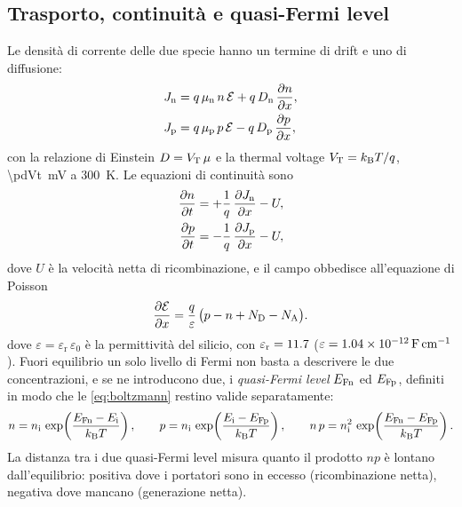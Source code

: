 \documentclass[10pt,a4paper]{scrartcl}
\let\newcommand\pdvaluedefine
\newcommand{\VT}{V_\mathrm{T}}
\newcommand{\Ef}{\mathcal{E}}                 %
\newcommand{\ND}{N_\mathrm{D}}
\newcommand{\NA}{N_\mathrm{A}}
\newcommand{\nint}{n_\mathrm{i}}
\newcommand{\Dn}{D_\mathrm{n}}
\newcommand{\Dp}{D_\mathrm{p}}
\newcommand{\mun}{\mu_\mathrm{n}}
\newcommand{\mup}{\mu_\mathrm{p}}
\newcommand{\Jn}{J_\mathrm{n}}
\newcommand{\Jp}{J_\mathrm{p}}
\newcommand{\kB}{k_\mathrm{B}}
\newcommand{\EFn}{E_\mathrm{Fn}}
\newcommand{\EFp}{E_\mathrm{Fp}}
\newcommand{\dpar}[2]{\frac{\partial #1}{\partial #2}}
\begin{document}
\subsection{Trasporto, continuità e quasi-Fermi level}
\label{sec:transport}
Le densità di corrente delle due specie hanno un termine di drift e uno di diffusione:
\begin{align}
\Jn &= q\,\mun\,n\,\Ef + q\,\Dn\,\dpar{n}{x} , \label{eq:jn}\\
\Jp &= q\,\mup\,p\,\Ef - q\,\Dp\,\dpar{p}{x} , \label{eq:jp}
\end{align}
con la relazione di Einstein $D = \VT\,\mu$ e la thermal voltage $\VT = \kB T/q$, \SI{\pdVt}{\milli\volt} a \SI{300}{\kelvin}. Le equazioni di continuità sono
\begin{align}
\dpar{n}{t} &= +\frac{1}{q}\,\dpar{\Jn}{x} - U , \label{eq:contn}\\
\dpar{p}{t} &= -\frac{1}{q}\,\dpar{\Jp}{x} - U , \label{eq:contp}
\end{align}
dove $U$ è la velocità netta di ricombinazione, e il campo obbedisce all'equazione di Poisson
\begin{equation}
\dpar{\Ef}{x} = \frac{q}{\varepsilon}\,\bigl(p - n + \ND - \NA\bigr) .
\label{eq:poisson}
\end{equation}
dove $\varepsilon = \varepsilon_\mathrm{r}\,\varepsilon_0$ è la permittività del silicio, con $\varepsilon_\mathrm{r} = \num{11.7}$ ($\varepsilon = \SI{1.04e-12}{\farad\per\centi\metre}$). Fuori equilibrio un solo livello di Fermi non basta a descrivere le due concentrazioni, e se ne introducono due, i \emph{quasi-Fermi level} $\EFn$ ed $\EFp$, definiti in modo che le \eqref{eq:boltzmann} restino valide separatamente:
\begin{equation}
n = \nint\,\exp\!\left(\frac{\EFn - E_\mathrm{i}}{\kB T}\right) , \qquad
p = \nint\,\exp\!\left(\frac{E_\mathrm{i} - \EFp}{\kB T}\right) , \qquad
n\,p = \nint^2\,\exp\!\left(\frac{\EFn - \EFp}{\kB T}\right) .
\label{eq:qfl}
\end{equation}
La distanza tra i due quasi-Fermi level misura quanto il prodotto $np$ è lontano dall'equilibrio: positiva dove i portatori sono in eccesso (ricombinazione netta), negativa dove mancano (generazione netta).
\end{document}
